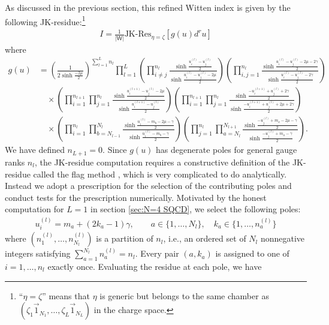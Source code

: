 \documentclass[a4paper,11pt]{article}
\begin{document}
As discussed in the previous section, this refined Witten index is given by the following JK-residue:\footnote{``$\eta = \zeta$'' means that $\eta$ is generic but belongs to the same chamber as $(\zeta_1 \vec 1_{N_1},\ldots,\zeta_L \vec 1_{N_L})$ in the charge space.}
\begin{align}
\label{eq:T[SU(N)] ind}
I = \frac{1}{|\mathsf W|} \text{JK-Res}_{\eta = \zeta} \left[g(u) d^r u\right]
\end{align}
where
\begin{align}
%
g(u) &= \left(\frac{1}{2 \sinh \frac{-2 \mu}{2}}\right)^{\sum_{l = 1}^L n_l} \prod_{l = 1}^L \left(\prod_{i \neq j}^{n_l} \frac{\sinh \frac{u^{(l)}_i-u^{(l)}_j}{2}}{\sinh \frac{u^{(l)}_i-u^{(l)}_j-2 \mu}{2}}\right) \left(\prod_{i,j = 1}^{n_l} \frac{\sinh \frac{u^{(l)}_i-u^{(l)}_j-2 \mu-2 \gamma}{2}}{\sinh \frac{u^{(l)}_i-u^{(l)}_j-2 \gamma}{2}}\right) \nonumber \\
%
&\quad \times \left(\prod_{i = 1}^{n_{l+1}} \prod_{j = 1}^{n_l} \frac{\sinh \frac{u^{(l+1)}_i-u^{(l)}_j-2 \mu}{2}}{\sinh \frac{u^{(l+1)}_i-u^{(l)}_j}{2}}\right) \left(\prod_{i = 1}^{n_{l+1}} \prod_{j = 1}^{n_l} \frac{\sinh \frac{-u^{(l+1)}_i+u^{(l)}_j+2 \gamma}{2}}{\sinh \frac{-u^{(l+1)}_i+u^{(l)}_j+2 \mu+2 \gamma}{2}}\right) \nonumber \\
%
&\quad \times \left(\prod_{i = 1}^{n_l} \prod_{b = N_{l-1}}^{N_l} \frac{\sinh \frac{u^{(l)}_i-m_b-2 \mu-\gamma}{2}}{\sinh \frac{u^{(l)}_i-m_b-\gamma}{2}}\right) \left(\prod_{j = 1}^{n_l} \prod_{a = N_l}^{N_{l+1}} \frac{\sinh \frac{-u^{(l)}_j+m_a-2 \mu-\gamma}{2}}{\sinh \frac{-u^{(l)}_j+m_a-\gamma}{2}}\right).
%
\end{align}
We have defined $n_{L+1} = 0$. Since $g(u)$ has degenerate poles for general gauge ranks $n_l$, the JK-residue computation requires a constructive definition of the JK-residue called the flag method \cite{Benini:2013xpa}, which is very complicated to do analytically. Instead we adopt a prescription for the selection of the contributing poles and conduct tests for the prescription numerically. Motivated by the honest computation for $L = 1$ in section \ref{sec:N=4 SQCD}, we select the following poles:
\begin{align}
u^{(l)}_i = m_a+(2 k_a-1) \gamma, \qquad a \in \{1,\ldots,N_l\}, \quad k_a \in \{1,\ldots,n^{(l)}_a\}
\end{align}
where $(n^{(l)}_1,\ldots,n^{(l)}_{N_l})$ is a partition of $n_l$, i.e., an ordered set of $N_l$ nonnegative integers satisfying $\sum_{a = 1}^{N_l} n^{(l)}_a = n_l$. Every pair $(a,k_a)$ is assigned to one of $i = 1,\ldots,n_l$ exactly once. Evaluating the residue at each pole, we have
\end{document}
